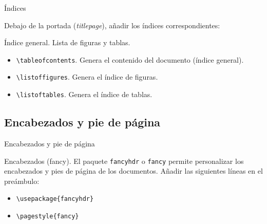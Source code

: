\documentclass[aspectratio=169, 10pt]{beamer}
\begin{document}
\begin{frame}[fragile]{Índices}

Debajo de la portada (\emph{titlepage}), añadir los índices correspondientes: 

    \begin{exampleblock}{Índice general. Lista de figuras y tablas.}
    \begin{itemize}
        \item \verb|\tableofcontents|. Genera el contenido del documento (índice general).
        \item \verb|\listoffigures|. Genera el índice de figuras.
        \item \verb|\listoftables|. Genera el índice de tablas.
    \end{itemize}
\end{exampleblock}
   
\end{frame}


\subsection{Encabezados y pie de página}
\begin{frame}[fragile]{Encabezados y pie de página}

\begin{block}{Encabezados (fancy).}
El paquete \verb|fancyhdr| o \verb|fancy| permite personalizar los encabezados y pies de página de los documentos.
Añadir las siguientes líneas en el preámbulo: 
    \begin{itemize}
        \item \verb|\usepackage{fancyhdr}|
        \item \verb|\pagestyle{fancy}|
    \end{itemize}
\end{block}

\end{frame}
\end{document}
